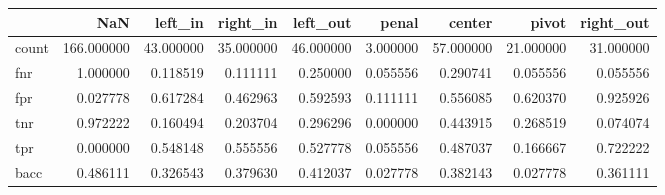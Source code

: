 \begin{tabular}{lrrrrrrrr}
\toprule
{} &         NaN &    left\_in &   right\_in &   left\_out &     penal &     center &      pivot &  right\_out \\
\midrule
count &  166.000000 &  43.000000 &  35.000000 &  46.000000 &  3.000000 &  57.000000 &  21.000000 &  31.000000 \\
fnr   &    1.000000 &   0.118519 &   0.111111 &   0.250000 &  0.055556 &   0.290741 &   0.055556 &   0.055556 \\
fpr   &    0.027778 &   0.617284 &   0.462963 &   0.592593 &  0.111111 &   0.556085 &   0.620370 &   0.925926 \\
tnr   &    0.972222 &   0.160494 &   0.203704 &   0.296296 &  0.000000 &   0.443915 &   0.268519 &   0.074074 \\
tpr   &    0.000000 &   0.548148 &   0.555556 &   0.527778 &  0.055556 &   0.487037 &   0.166667 &   0.722222 \\
bacc  &    0.486111 &   0.326543 &   0.379630 &   0.412037 &  0.027778 &   0.382143 &   0.027778 &   0.361111 \\
\bottomrule
\end{tabular}
